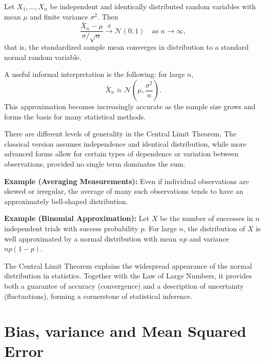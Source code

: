 \medskip

Let $X_1, \dots, X_n$ be independent and identically distributed random variables with mean $\mu$ and finite variance $\sigma^2$. Then
\begin{equation}
    \frac{\bar{X}_n - \mu}{\sigma/\sqrt{n}} \xrightarrow{d} \mathcal{N}(0,1) \quad \text{as } n \to \infty,
\end{equation}
that is, the standardized sample mean converges in distribution to a standard normal random variable.

\medskip

A useful informal interpretation is the following: for large $n$,
\[
\bar{X}_n \approx \mathcal{N}\!\left(\mu, \frac{\sigma^2}{n}\right).
\]
This approximation becomes increasingly accurate as the sample size grows and forms the basis for many statistical methods.

\medskip

There are different levels of generality in the Central Limit Theorem. The classical version assumes independence and identical distribution, while more advanced forms allow for certain types of dependence or variation between observations, provided no single term dominates the sum.

\medskip

\textbf{Example (Averaging Measurements):} Even if individual observations are skewed or irregular, the average of many such observations tends to have an approximately bell-shaped distribution.

\medskip

\textbf{Example (Binomial Approximation):} Let $X$ be the number of successes in $n$ independent trials with success probability $p$. For large $n$, the distribution of $X$ is well approximated by a normal distribution with mean $np$ and variance $np(1-p)$.

\medskip

The Central Limit Theorem explains the widespread appearance of the normal distribution in statistics. Together with the Law of Large Numbers, it provides both a guarantee of accuracy (convergence) and a description of uncertainty (fluctuations), forming a cornerstone of statistical inference.

\section{Bias, variance and Mean Squared Error}

